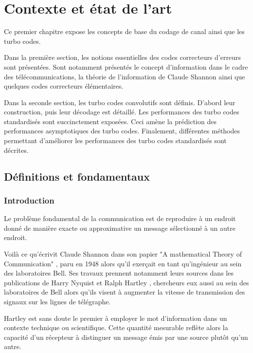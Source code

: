 
\chapter{Contexte et état de l'art}
Ce premier chapitre expose les concepts de base du codage de canal ainsi que les turbo codes.

Dans la première section, les notions essentielles des codes correcteurs d'erreurs sont présentées. Sont notamment 
présentés le concept 
d'information dans le cadre des télécommunications, la théorie de l'information de Claude Shannon ainsi que
quelques codes correcteurs élémentaires.

Dans la seconde section, les turbo codes convolutifs sont définis. D'abord leur construction, puis leur décodage est 
détaillé. 
Les performances des turbo codes standardisés sont succinctement exposées. Ceci amène la prédiction des performances 
asymptotiques des turbo codes. Finalement, différentes méthodes permettant d'améliorer les performances des turbo codes 
standardisés sont décrites. 

\vspace*{\fill}
\minitocTITI
\vspace*{\fill}

\section{Définitions et fondamentaux}

\subsection{Introduction}
\og Le problème fondamental de la communication est de reproduire à un endroit donné de manière exacte ou approximative 
un message sélectionné à un autre endroit.\fg

Voilà ce qu'écrivit Claude Shannon dans son papier "A mathematical Theory of Communication" \cite{shannon_mathematical_2001}, 
paru en 1948 alors qu'il exerçait en tant qu'ingénieur au sein des laboratoires Bell. Ses travaux prennent notamment 
leurs sources dans les publications de Harry Nyquist \cite{nyquist_telegraph} et Ralph Hartley \cite{hartley_trans}, 
chercheurs eux aussi au sein des laboratoires de Bell alors qu'ils visent à augmenter la vitesse de transmission des signaux sur 
les lignes de télégraphe. 

Hartley est sans doute le premier à employer le mot d'information dans un contexte technique ou scientifique. Cette 
quantité mesurable reflète alors la capacité d'un récepteur à distinguer un message émis par une 
source plutôt qu'un autre.

